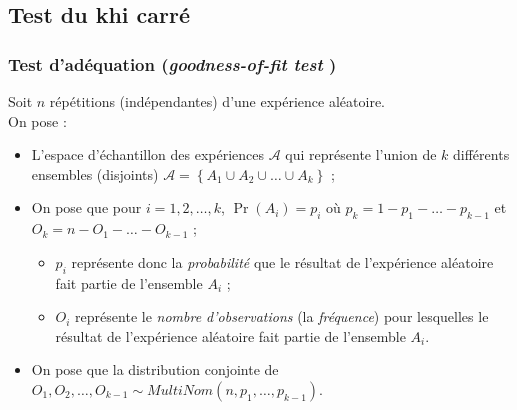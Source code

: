 \documentclass[10pt, french]{article}
\begin{document}
\begin{multicols*}{2}


\columnbreak
\subsection{Test du khi carré}
\subsubsection*{Test d'adéquation (\og \textit{goodness-of-fit test} \fg{})}
Soit $n$ répétitions (indépendantes) d'une expérience aléatoire.\\
On pose :
\begin{itemize}
	\item	L'espace d'échantillon des expériences $\mathcal{A}$ qui représente l'union de $k$ différents ensembles (disjoints) $\mathcal{A}	=	\left\{A_{1} \cup A_{2} \cup \dots \cup A_{k} \right\}$ ;
	\item	On pose que pour $i	=	1, 2, \dots, k$, $\Pr(A_{i})	=	p_{i}$ où $p_{k}	=	1	-	p_{1}	-	\hdots	-	p_{k - 1}$ et $O_{k}	=	n	-	O_{1}	-	\hdots	-	O_{k - 1}$ ;
		\begin{itemize}
		\item	$p_{i}$ représente donc la \textit{probabilité} que le résultat de l'expérience aléatoire fait partie de l'ensemble $A_{i}$ ;
		\item	$O_{i}$	représente le \textit{nombre d'observations} (la \textit{fréquence}) pour lesquelles le résultat de l'expérience aléatoire fait partie de l'ensemble $A_{i}$.
		\end{itemize}
	\item	On pose que la distribution conjointe de $O_{1}, O_{2}, \dots, O_{k - 1} \sim MultiNom(n, p_{1}, \dots, p_{k - 1})$.
\end{itemize}


\end{multicols*}
\end{document}
